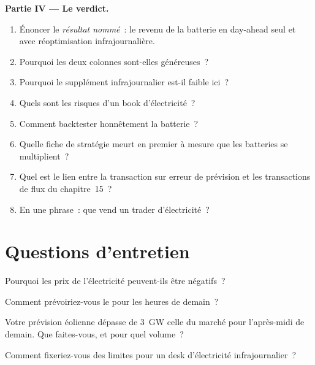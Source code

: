 \begin{problem}
\medskip\noindent\textbf{Partie IV --- Le verdict.}
\begin{enumerate}[resume]
\item Énoncer le \emph{résultat nommé}~: le revenu de la batterie en day-ahead seul et avec réoptimisation infrajournalière.
\item Pourquoi les deux colonnes sont-elles généreuses~?
\item Pourquoi le supplément infrajournalier est-il faible ici~?
\item Quels sont les risques d'un book d'électricité~?
\item Comment backtester honnêtement la batterie~?
\item Quelle fiche de stratégie meurt en premier à mesure que les batteries se multiplient~?
\item Quel est le lien entre la transaction sur erreur de prévision et les transactions de flux du chapitre~15~?
\item En une phrase~: que vend un trader d'électricité~?
\end{enumerate}
\end{problem}

\section{Questions d'entretien}

\begin{interviewq}\label{iq:s2:power-and-gas-trading:1}
Pourquoi les prix de l'électricité peuvent-ils être négatifs~?
\end{interviewq}

\begin{interviewq}\label{iq:s2:power-and-gas-trading:2}
Comment prévoiriez-vous le  pour les heures de demain~?
\end{interviewq}

\begin{interviewq}\label{iq:s2:power-and-gas-trading:3}
Votre prévision éolienne dépasse de 3~GW celle du marché pour l'après-midi de demain. Que faites-vous, et pour quel volume~?
\end{interviewq}

\begin{interviewq}\label{iq:s2:power-and-gas-trading:4}
Comment fixeriez-vous des limites pour un desk d'électricité infrajournalier~?
\end{interviewq}

